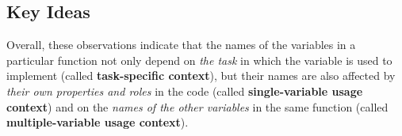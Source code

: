\subsection{Key Ideas}
\label{key:sec}

Overall, these observations indicate that the names of the variables
in a particular function not only depend on {\em the task} in which
the variable is used to implement (called {\bf task-specific context}), but
their names are also affected by {\em their own properties and roles} in the
code (called {\bf single-variable usage context}) and on the {\em names of the
other variables} in the same function (called {\bf multiple-variable usage
  context}).
